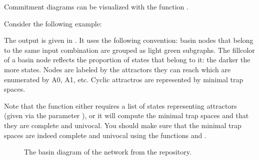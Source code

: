 \documentclass[letterpaper,10pt,english]{sphinxmanual}
\begin{document}
Commitment diagrams can be visualized with the function {\hyperref[\detokenize{Commitment:commitment-diagram2image}]{}}.

Consider the following example:

\begin{sphinxVerbatim}[commandchars=\\\{\}]
  
    
\end{sphinxVerbatim}

The output is given in {\hyperref[\detokenize{Manual:figure26}]{}}.
It uses the following convention: basin nodes that belong to the same input combination are grouped as light green subgraphs.
The fillcolor of a basin node reflects the proportion of states that belong to it: the darker the more states.
Nodes are labeled by the attractors they can reach which are enumerated by A0, A1, etc.
Cyclic attractros are represented by minimal trap spaces.

Note that the function  either requires a list of states representing attractors (given via the parameter ),
or it will compute the minimal trap spaces and  that they are complete and univocal.
You should make sure that the minimal trap spaces are indeed complete and univocal using the functions {\hyperref[\detokenize{Attractors:completeness}]{}} and {\hyperref[\detokenize{Attractors:univocality}]{}}.

\begin{figure}[htbp]
\centering
\capstart

\noindent{}
\caption{The basin diagram of the network  from the repository.}\label{\detokenize{Manual:figure26}}\label{\detokenize{Manual:id30}}\end{figure}
\end{document}
